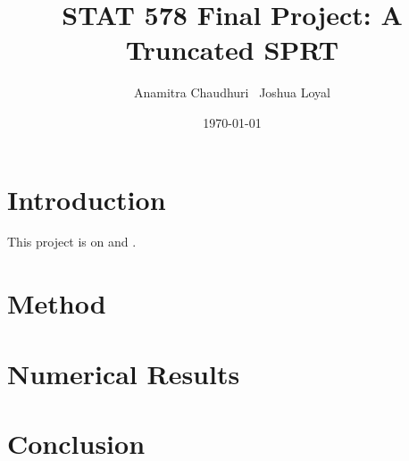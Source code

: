 \documentclass[11pt]{article}
\begin{document}
\title{  {\LARGE STAT 578 Final Project: A Truncated SPRT} }

\author{
    Anamitra Chaudhuri \,
    Joshua Loyal
}

\date{\today}
\maketitle

\section{Introduction}

This project is on \citet{tantara1977} and \citet{tantara1982}.

\section{Method}

\section{Numerical Results}

\section{Conclusion}



\end{document}

